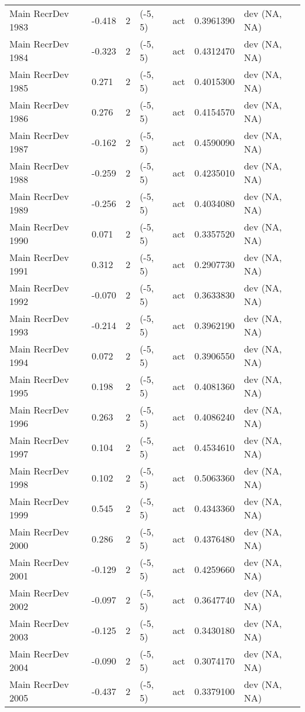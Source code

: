 \documentclass[11pt,
  english,
  a4paper,
]{article}
\begin{document}
\begin{landscape}
\begin{longtable}[t]{>{\raggedright\arraybackslash}p{6cm}lllll>{\raggedright\arraybackslash}p{4cm}}
Main RecrDev 1983 & -0.418 & 2 & (-5, 5) & act & 0.3961390 & dev (NA, NA)\\
Main RecrDev 1984 & -0.323 & 2 & (-5, 5) & act & 0.4312470 & dev (NA, NA)\\
Main RecrDev 1985 & 0.271 & 2 & (-5, 5) & act & 0.4015300 & dev (NA, NA)\\
Main RecrDev 1986 & 0.276 & 2 & (-5, 5) & act & 0.4154570 & dev (NA, NA)\\
Main RecrDev 1987 & -0.162 & 2 & (-5, 5) & act & 0.4590090 & dev (NA, NA)\\
Main RecrDev 1988 & -0.259 & 2 & (-5, 5) & act & 0.4235010 & dev (NA, NA)\\
Main RecrDev 1989 & -0.256 & 2 & (-5, 5) & act & 0.4034080 & dev (NA, NA)\\
Main RecrDev 1990 & 0.071 & 2 & (-5, 5) & act & 0.3357520 & dev (NA, NA)\\
Main RecrDev 1991 & 0.312 & 2 & (-5, 5) & act & 0.2907730 & dev (NA, NA)\\
Main RecrDev 1992 & -0.070 & 2 & (-5, 5) & act & 0.3633830 & dev (NA, NA)\\
Main RecrDev 1993 & -0.214 & 2 & (-5, 5) & act & 0.3962190 & dev (NA, NA)\\
Main RecrDev 1994 & 0.072 & 2 & (-5, 5) & act & 0.3906550 & dev (NA, NA)\\
Main RecrDev 1995 & 0.198 & 2 & (-5, 5) & act & 0.4081360 & dev (NA, NA)\\
Main RecrDev 1996 & 0.263 & 2 & (-5, 5) & act & 0.4086240 & dev (NA, NA)\\
Main RecrDev 1997 & 0.104 & 2 & (-5, 5) & act & 0.4534610 & dev (NA, NA)\\
Main RecrDev 1998 & 0.102 & 2 & (-5, 5) & act & 0.5063360 & dev (NA, NA)\\
Main RecrDev 1999 & 0.545 & 2 & (-5, 5) & act & 0.4343360 & dev (NA, NA)\\
Main RecrDev 2000 & 0.286 & 2 & (-5, 5) & act & 0.4376480 & dev (NA, NA)\\
Main RecrDev 2001 & -0.129 & 2 & (-5, 5) & act & 0.4259660 & dev (NA, NA)\\
Main RecrDev 2002 & -0.097 & 2 & (-5, 5) & act & 0.3647740 & dev (NA, NA)\\
Main RecrDev 2003 & -0.125 & 2 & (-5, 5) & act & 0.3430180 & dev (NA, NA)\\
Main RecrDev 2004 & -0.090 & 2 & (-5, 5) & act & 0.3074170 & dev (NA, NA)\\
Main RecrDev 2005 & -0.437 & 2 & (-5, 5) & act & 0.3379100 & dev (NA, NA)\\

\end{longtable}
\end{landscape}
\end{document}
